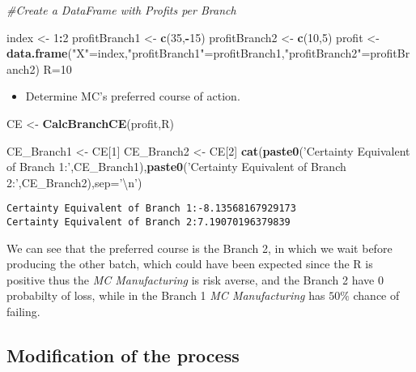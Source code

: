 \documentclass[]{article}
\newenvironment{Shaded}{\begin{snugshade}}{\end{snugshade}}
\newcommand{\KeywordTok}[1]{\textcolor[rgb]{0.13,0.29,0.53}{\textbf{#1}}}
\newcommand{\DataTypeTok}[1]{\textcolor[rgb]{0.13,0.29,0.53}{#1}}
\newcommand{\DecValTok}[1]{\textcolor[rgb]{0.00,0.00,0.81}{#1}}
\newcommand{\CharTok}[1]{\textcolor[rgb]{0.31,0.60,0.02}{#1}}
\newcommand{\StringTok}[1]{\textcolor[rgb]{0.31,0.60,0.02}{#1}}
\newcommand{\CommentTok}[1]{\textcolor[rgb]{0.56,0.35,0.01}{\textit{#1}}}
\newcommand{\OperatorTok}[1]{\textcolor[rgb]{0.81,0.36,0.00}{\textbf{#1}}}
\newcommand{\NormalTok}[1]{#1}
\providecommand{\tightlist}{%
  \setlength{\itemsep}{0pt}\setlength{\parskip}{0pt}}
\begin{document}
\begin{Shaded}
\begin{Highlighting}[]
\CommentTok{#Create a DataFrame with Profits per Branch}

\NormalTok{index <-}\StringTok{ }\DecValTok{1}\OperatorTok{:}\DecValTok{2}
\NormalTok{profitBranch1 <-}\StringTok{ }\KeywordTok{c}\NormalTok{(}\DecValTok{35}\NormalTok{,}\OperatorTok{-}\DecValTok{15}\NormalTok{)}
\NormalTok{profitBranch2 <-}\StringTok{ }\KeywordTok{c}\NormalTok{(}\DecValTok{10}\NormalTok{,}\DecValTok{5}\NormalTok{)}
\NormalTok{profit <-}\StringTok{ }\KeywordTok{data.frame}\NormalTok{(}\StringTok{"X"}\NormalTok{=index,}\StringTok{"profitBranch1"}\NormalTok{=profitBranch1,}\StringTok{"profitBranch2"}\NormalTok{=profitBranch2)}
\NormalTok{R=}\DecValTok{10}
\end{Highlighting}
\end{Shaded}

\begin{itemize}
\tightlist
\item
  Determine MC's preferred course of action.
\end{itemize}

\begin{Shaded}
\begin{Highlighting}[]
\NormalTok{CE <-}\StringTok{ }\KeywordTok{CalcBranchCE}\NormalTok{(profit,R)}

\NormalTok{CE_Branch1 <-}\StringTok{ }\NormalTok{CE[}\DecValTok{1}\NormalTok{]}
\NormalTok{CE_Branch2 <-}\StringTok{ }\NormalTok{CE[}\DecValTok{2}\NormalTok{]}
\KeywordTok{cat}\NormalTok{(}\KeywordTok{paste0}\NormalTok{(}\StringTok{'Certainty Equivalent of Branch 1:'}\NormalTok{,CE_Branch1),}\KeywordTok{paste0}\NormalTok{(}\StringTok{'Certainty Equivalent of Branch 2:'}\NormalTok{,CE_Branch2),}\DataTypeTok{sep=}\StringTok{'}\CharTok{\textbackslash{}n}\StringTok{'}\NormalTok{)}
\end{Highlighting}
\end{Shaded}

\begin{verbatim}
Certainty Equivalent of Branch 1:-8.13568167929173
Certainty Equivalent of Branch 2:7.19070196379839
\end{verbatim}

We can see that the preferred course is the Branch 2, in which we wait
before producing the other batch, which could have been expected since
the R is positive thus the \emph{MC Manufacturing} is risk averse, and
the Branch 2 have 0 probabilty of loss, while in the Branch 1 \emph{MC
Manufacturing} has \(50\%\) chance of failing.

\subsection{Modification of the
process}\label{modification-of-the-process}
\end{document}
